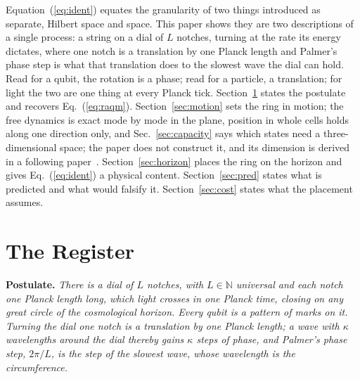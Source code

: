 \documentclass[aps,prd,twocolumn,superscriptaddress,nofootinbib]{revtex4-2}
\begin{document}
Equation~(\ref{eq:ident}) equates the granularity of two things introduced as separate, Hilbert space and space. This paper shows they are two descriptions of a single process: a string on a dial of $L$ notches, turning at the rate its energy dictates, where one notch is a translation by one Planck length and Palmer's phase step is what that translation does to the slowest wave the dial can hold. Read for a qubit, the rotation is a phase; read for a particle, a translation; for light the two are one thing at every Planck tick. Section~\ref{sec:register} states the postulate and recovers Eq.~(\ref{eq:raqm}). Section~\ref{sec:motion} sets the ring in motion; the free dynamics is exact mode by mode in the plane, position in whole cells holds along one direction only, and Sec.~\ref{sec:capacity} says which states need a three-dimensional space; the paper does not construct it, and its dimension is derived in a following paper~\cite{korytko2026d}. Section~\ref{sec:horizon} places the ring on the horizon and gives Eq.~(\ref{eq:ident}) a physical content. Section~\ref{sec:pred} states what is predicted and what would falsify it. Section~\ref{sec:cost} states what the placement assumes.

\section{The Register}
\label{sec:register}

\textbf{Postulate.} \emph{There is a dial of $L$ notches, with $L\in\mathbb{N}$ universal and each notch one Planck length long, which light crosses in one Planck time, closing on any great circle of the cosmological horizon. Every qubit is a pattern of marks on it. Turning the dial one notch is a translation by one Planck length; a wave with $\kappa$ wavelengths around the dial thereby gains $\kappa$ steps of phase, and Palmer's phase step, $2\pi/L$, is the step of the slowest wave, whose wavelength is the circumference.}
\end{document}
